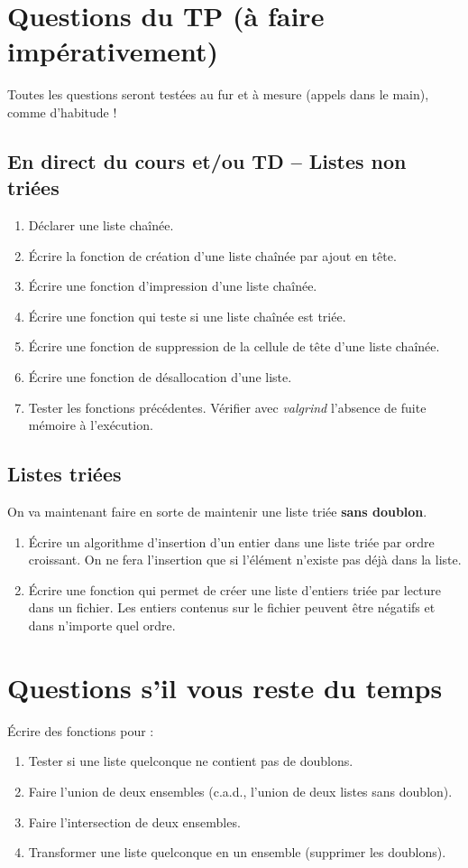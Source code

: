 \documentclass[final, pdftex, a4paper, openbib, ]{article}
\begin{document}
\section{Questions du TP \large (à faire impérativement)}

Toutes les questions seront testées au fur et à mesure (appels dans le main), comme d'habitude !


\subsection{En direct du cours et/ou TD – Listes non triées}
	\begin{enumerate}
		\item Déclarer une liste chaînée.
		\item Écrire la fonction de création d'une liste chaînée par ajout en tête.
		\item Écrire une fonction d'impression d'une liste chaînée.
		\item Écrire une fonction qui teste si une liste chaînée est triée.
		\item Écrire une fonction de suppression de la cellule de tête d'une liste chaînée.
		\item Écrire une fonction de désallocation d'une liste.
		\item Tester les fonctions précédentes. Vérifier avec \textit{valgrind} l'absence de fuite mémoire à l'exécution.
	\end{enumerate}


\subsection{Listes triées}
On va maintenant faire en sorte de maintenir une liste triée \textbf{sans doublon}.

	\begin{enumerate}
		\item Écrire un algorithme d'insertion d'un entier dans une liste triée par ordre croissant. On ne fera l'insertion que si l'élément n'existe pas déjà dans la liste.
		\item Écrire une fonction qui permet de créer une liste d'entiers triée par lecture dans un fichier. Les entiers contenus sur le fichier peuvent être négatifs et dans n'importe quel ordre.
	\end{enumerate}

\section{Questions s’il vous reste du temps}
Écrire des fonctions pour :
	\begin{enumerate}
		\item Tester si une liste quelconque ne contient pas de doublons.
		\item Faire l'union de deux ensembles (c.a.d., l'union de deux listes sans doublon).
		\item Faire l'intersection de deux ensembles.
		\item Transformer une liste quelconque en un ensemble (supprimer les doublons).
	\end{enumerate}
\end{document}
